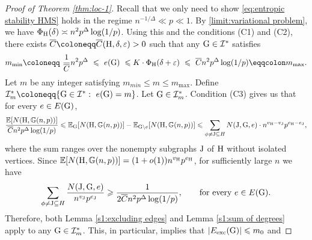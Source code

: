 \documentclass[a4paper,11pt,english,reqno]{amsart}
\numberwithin{equation}{section}
\renewcommand{\leq}{\leqslant}
\renewcommand{\geq}{\geqslant}
\newcommand{\cbar}{\overline{C}}
\newcommand{\I}{\mathcal{I}}
\newcommand{\E}{\mathbb{E}}
\newcommand{\uH}{\textup{H}}
\newcommand{\G}{\mathbb{G}}
\newcommand{\tu}[1]{\textup{#1}}
\begin{document}
		\begin{proof}[Proof of Theorem \ref{thm:loc-1}]
			Recall that we only need to show \eqref{eq:entropic stability HMS} holds in the regime $n^{-1/\Delta}\ll p\ll 1$. 
			By %
			\eqref{limit:variational problem}, we have $\Phi_{\uH}(\delta)  \asymp n^{2}p^{\Delta}\log(1/p)$.  
			Using this and the conditions (C1) and (C2), %
			there exists $ \cbar\coloneqq \cbar(\uH, \delta, \varepsilon)>0$ such that any $\tu{G}\in \I^{*}$ satisfies
			\begin{equation*}
				m_{\min} \coloneqq\ \frac{1}{\cbar} n^{2}p^{\Delta}\ \leq\ e(\tu{G})\ \leq K\cdot \Phi_{\uH}(\delta+\varepsilon)\ \leq\ \cbar n^{2}p^{\Delta}\log(1/p) \eqqcolon m_{\max}.
			\end{equation*}
			Let $m$ be any integer satisfying $m_{min}\leq m\leq m_{\max}$. Define %
			$ \I^{*}_{m} \coloneqq \{\tu{G}\in \I^{*}:\ e(\tu{G}) = m\}$.
			Let $\tu{G}\in \I^{*}_{m}$. Condition (C3) gives us that for every $e\in E(\tu{G})$,
			\begin{equation*}
				\frac{\E[N(\uH,\G(n,p))]}{\cbar n^{2}p^{\Delta}\log(1/p)}\leq \E_{\tu{G}}[N(\uH, \G(n,p))] - \E_{\tu{G}\setminus e}[N(\uH, \G(n,p))] \leq \sum_{\phi\neq \tu{J}\subseteq H} N(\tu{J}, \tu{G},e)\cdot n^{v_{\uH}-v_{\tu{J}}}p^{e_{\uH}-e_{\tu{J}}},
			\end{equation*}
			where the sum ranges over the nonempty subgraphs $\tu{J}$ of $\tu{H}$ without isolated vertices. Since $\E[N(\uH,\G(n,p))] = (1+o(1))n^{v_{\uH}}p^{e_{\uH}}$, for sufficiently large $n$ we have%
			\begin{equation*}
				\sum_{\phi\neq \tu{J}\subseteq H} \frac{N(\tu{J},\tu{G},e)}{n^{v_{\tu{J}}}p^{e_{\tu{J}}}} \geq \frac{1}{2 \cbar n^2p^{\Delta}\log(1/p)}, \qquad \text{for every $e\in E(\tu{G})$}.
			\end{equation*}
			Therefore, %
			both Lemma \ref{s1:excluding edges} and Lemma \ref{s1:sum of degrees} apply to any $\tu{G} \in \I^*_m$. This, in particular, implies that $|E_{\text{exc}}(\tu{G})|\leq m_0$ and %

\end{proof}
\end{document}
